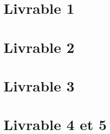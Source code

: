 \documentclass[a4paper, french, 12pt]{report}
\begin{document}




\tableofcontents

\part{Livrable 1}







\part{Livrable 2}









\part{Livrable 3}









\part{Livrable 4 et 5}



\listoffigures
\end{document}
